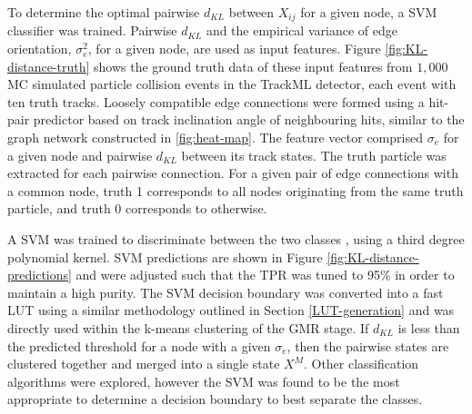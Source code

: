 To determine the optimal pairwise $d_{KL}$ between $X_{ij}$ for a given node, a SVM classifier was trained. Pairwise $d_{KL}$ and the empirical variance of edge orientation, $\sigma_{e}^{2}$, for a given node, are used as input features. Figure \ref{fig:KL-distance-truth} shows the ground truth data of these input features from $1,000$ MC simulated particle collision events in the TrackML detector, each event with ten truth tracks. Loosely compatible edge connections were formed using a hit-pair predictor based on track inclination angle of neighbouring hits, similar to the graph network constructed in \ref{fig:heat-map}. The feature vector comprised $\sigma_{e}$ for a given node and pairwise $d_{KL}$ between its track states. The truth particle was extracted for each pairwise connection. For a given pair of edge connections with a common node, truth 1 corresponds to all nodes originating from the same truth particle, and truth 0 corresponds to otherwise. 


A SVM was trained to discriminate between the two classes \cite{scikit-learn}, using a third degree polynomial kernel. SVM predictions are shown in Figure \ref{fig:KL-distance-predictions} and were adjusted such that the TPR was tuned to 95\% in order to maintain a high purity. The SVM decision boundary was converted into a fast LUT using a similar methodology outlined in Section \ref{LUT-generation} and was directly used within the k-means clustering of the GMR stage. If $d_{KL}$ is less than the predicted threshold for a node with a given $\sigma_e$, then the pairwise states are clustered together and merged into a single state $X^M$. Other classification algorithms were explored, however the SVM was found to be the most appropriate to determine a decision boundary to best separate the classes.

